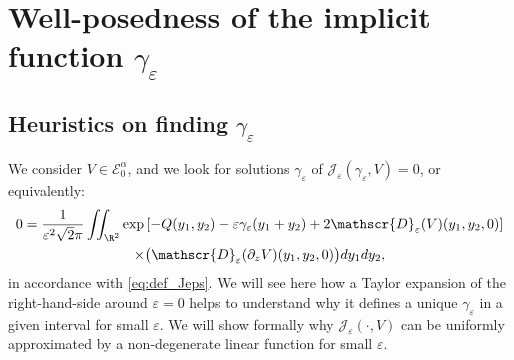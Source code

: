 \documentclass[10pt]{amsart}
\let\mathcal\mathscr
\theoremstyle{plain}
\theoremstyle{definition}
\newcommand{\D}{\mathcal{D}_\eps}
\newcommand{\Je}{\mathcal{J}_\eps}
\let\eps\varepsilon
\let\ds\displaystyle
\newcommand{\Eaz}{\mathcal{E}^\alpha_0}
\begin{document}
\section{Well-posedness of the implicit function \texorpdfstring{$\gamma_\eps$}{ge}}\label{sec existunique gammaeps}
\subsection{Heuristics on finding \texorpdfstring{$\gamma_\eps$}{ge}}\label{sec heuristicsgammaeps}
We consider $V \in \Eaz$, and we look for solutions $\gamma_\eps$ of $\Je(\gamma_\eps,V) = 0$, or equivalently:
\begin{multline}\label{eq:heurgam_equ}
0 = \dfrac{1}{\eps^2\sqrt{2}\pi} \ds \iint_{\R^2} \exp \left[-Q(y_1,y_2) - \eps \gamma_\eps (y_1+y_2) +2 \D(V)(y_1,y_2,0) \right]\\
\times \bigl(\D(\partial_z V)(y_1,y_2,0)\bigr) d y_1 d y_2,
\end{multline}
in accordance with \eqref{eq:def_Jeps}. We will see here how a Taylor expansion of the right-hand-side around $\eps = 0$ helps to understand why it defines a unique $\gamma_\eps$ in a given interval for small $\eps$. We will show formally why $\Je(\cdot,V)$ can be uniformly approximated by a non-degenerate linear function for small $\eps$.
\end{document}
